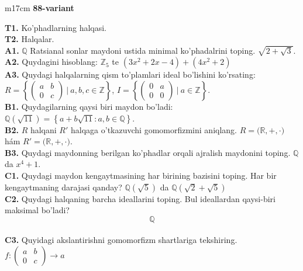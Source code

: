 \documentclass{article}
\begin{document}
\begin{tabular}{m{17cm}}
\textbf{88-variant}
\newline

\textbf{T1.} Ko'phadlarning halqasi. \\
\textbf{T2.} Halqalar. \\
\textbf{A1.} \(\mathbb{Q}\) Ratsianal sonlar maydoni ustida minimal ko'phadalrini toping.
\(\sqrt{2 + \sqrt{3}}\). \\
\textbf{A2.} Quydagini hisoblang:
\(\mathbb{Z}_{5}\) te \(\left( 3x^{2} + 2x - 4 \right) + \left( 4x^{2} + 2 \right)\) \\
\textbf{A3.} Quydagi halqalarning qism to'plamlari ideal bo'lishini ko'rsating: \(R = \left\{ \begin{pmatrix}
a & b \\
0 & c
\end{pmatrix}\ |\ a,b,c \in \mathbb{Z} \right\}\), \(I = \left\{ \begin{pmatrix}
0 & a \\
0 & 0
\end{pmatrix}\ |\ a \in \mathbb{Z} \right\}\). \\
\textbf{B1.} Quydagilarning qaysi biri maydon bo'ladi:
\(\mathbb{Q}\left( \sqrt{11} \right) = \left\{ a + b\sqrt{11}:a,b \in \mathbb{Q} \right\}\). \\
\textbf{B2.} \(R\) halqani \(R'\) halqaga o'tkazuvchi gomomorfizmini aniqlang.
\(R\mathbb{= (R,} + , \cdot )\) hám \(R'\mathbb{= (R,} + , \cdot )\). \\
\textbf{B3.} Quydagi maydonning berilgan ko'phadlar orqali ajralish maydonini toping.
\(\mathbb{Q}\) da \(x^{4} + 1\). \\
\textbf{C1.} Quydagi maydon kengaytmasining har birining bazisini toping. Har bir kengaytmaning darajasi qanday?
\(\mathbb{Q}\left( \sqrt{5} \right)\) da \(\mathbb{Q}\left( \sqrt{2} + \sqrt{5} \right)\) \\
\textbf{C2.} Quydagi halqaning barcha ideallarini toping. Bul ideallardan qaysi-biri maksimal bo'ladi?
\[\mathbb{Q}\] \\
\textbf{C3.} Quyidagi akslantirishni gomomorfizm shartlariga tekshiring. \(f:\begin{pmatrix}
a & b \\
0 & c
\end{pmatrix} \rightarrow a\) \\

\end{tabular}
\vspace{1cm}
\end{document}
